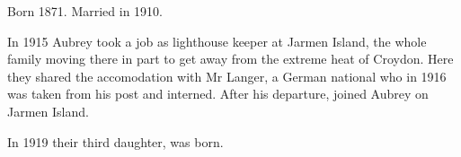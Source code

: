 
Born 1871. Married  in 1910.\cite{HAHmarriage}

In 1915 Aubrey took a job as lighthouse keeper at Jarmen Island,
the whole family moving there in part to get away from the extreme heat of Croydon.\cite{Connie1983}
Here they shared the accomodation with Mr Langer,
a German national who in 1916 was taken from his post and interned.\cite{Connie1983}
After his departure,  joined Aubrey on Jarmen Island.

In 1919 their third daughter,  was born.
